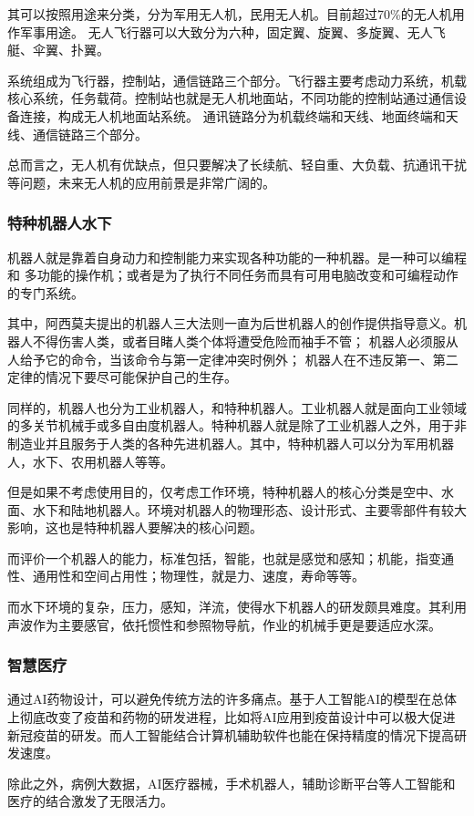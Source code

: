 \documentclass[12pt,a4paper,oneside]{article}
\begin{document}
其可以按照用途来分类，分为军用无人机，民用无人机。目前超过70\%的无人机用作军事用途。
无人飞行器可以大致分为六种，固定翼、旋翼、多旋翼、无人飞艇、伞翼、扑翼。

系统组成为飞行器，控制站，通信链路三个部分。飞行器主要考虑动力系统，机载核心系统，任务载荷。控制站也就是无人机地面站，不同功能的控制站通过通信设备连接，构成无人机地面站系统。
通讯链路分为机载终端和天线、地面终端和天线、通信链路三个部分。

总而言之，无人机有优缺点，但只要解决了长续航、轻自重、大负载、抗通讯干扰等问题，未来无人机的应用前景是非常广阔的。
\subsubsection{特种机器人水下}
机器人就是靠着自身动力和控制能力来实现各种功能的一种机器。是一种可以编程和
多功能的操作机；或者是为了执行不同任务而具有可用电脑改变和可编程动作的专门系统。

其中，阿西莫夫提出的机器人三大法则一直为后世机器人的创作提供指导意义。机器人不得伤害人类，或者目睹人类个体将遭受危险而袖手不管；
机器人必须服从人给予它的命令，当该命令与第一定律冲突时例外；
机器人在不违反第一、第二定律的情况下要尽可能保护自己的生存。

同样的，机器人也分为工业机器人，和特种机器人。工业机器人就是面向工业领域的多关节机械手或多自由度机器人。特种机器人就是除了工业机器人之外，用于非制造业并且服务于人类的各种先进机器人。其中，特种机器人可以分为军用机器人，水下、农用机器人等等。

但是如果不考虑使用目的，仅考虑工作环境，特种机器人的核心分类是空中、水面、水下和陆地机器人。环境对机器人的物理形态、设计形式、主要零部件有较大影响，这也是特种机器人要解决的核心问题。

而评价一个机器人的能力，标准包括，智能，也就是感觉和感知；机能，指变通性、通用性和空间占用性；物理性，就是力、速度，寿命等等。

而水下环境的复杂，压力，感知，洋流，使得水下机器人的研发颇具难度。其利用声波作为主要感官，依托惯性和参照物导航，作业的机械手更是要适应水深。


\subsubsection{智慧医疗}
通过AI药物设计，可以避免传统方法的许多痛点。基于人工智能AI的模型在总体上彻底改变了疫苗和药物的研发进程，比如将AI应用到疫苗设计中可以极大促进新冠疫苗的研发。而人工智能结合计算机辅助软件也能在保持精度的情况下提高研发速度。

除此之外，病例大数据，AI医疗器械，手术机器人，辅助诊断平台等人工智能和医疗的结合激发了无限活力。
\end{document}
